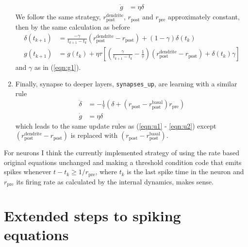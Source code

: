 \documentclass{article}
\begin{document}
\begin{enumerate}
\begin{align}
     \dot{g} &= \eta \delta
   \end{align}
   We follow the same strategy, $r^{\text{dendrite}}_{\text{post}}$,
   $r_{\text{post}}$ and $r_{\text{pre}}$ approximately constant, then
   by the same calculation as before
   \begin{align}
          \delta(t_{k+1}) &= \frac{-\gamma}{t_{k+1}-t_k}
     (r^{\text{dendrite}}_{\text{post}} -
     r_{\text{post}}) + (1-\gamma) \delta(t_k)  \label{eqn:u1} \\
     g(t_{k+1}) &= g(t_k) + \eta \tau \left[\left(\frac{\gamma}{t_{k+1}
         - t_k} - \frac{1}{\tau}\right) (r^{\text{dendrite}}_{\text{post}} -
     r_{\text{post}})
       +\delta(t_k) \gamma \right] \label{eqn:u2} 
   \end{align}
   and $\gamma$ as in (\ref{eqn:g1}).
   \item Finally, synapse to deeper layers, \verb+synapses_up+, are
     learning with a similar rule
     \begin{align}
        \dot{\delta} &= -\frac{1}{\tau} \left(\delta +
     (r_{\text{post}} - r^{\text{basal}}_{\text{post}}
     )r_{\text{pre}}\right) \\
     \dot{g} &= \eta \delta
     \end{align}
     which leads to the same update rules as (\ref{eqn:u1} -
     \ref{eqn:u2}) except $(r^{\text{dendrite}}_{\text{post}} -
     r_{\text{post}})$ is replaced with $(r_{\text{post}} - r^{\text{basal}}_{\text{post}})$.
\end{enumerate}
For neurons I think the currently implemented strategy of using the
rate based original equations unchanged and making a threshold
condition code that emits spikes whenever $t-t_k \geq 1/r_{\text{pre}}$,
where $t_k$ is the last spike time in the neuron and $r_{\text{pre}}$
its firing rate as calculated by the internal dynamics, makes sense.


\section{Extended steps to spiking equations}
\end{document}
